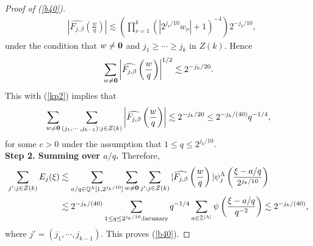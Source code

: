 \documentclass[11 pt,letterpaper]{amsart}
\theoremstyle{plain}
\theoremstyle{definition}
\theoremstyle{remark} \theoremstyle{exam} \theoremstyle{ob}
\numberwithin{equation}{section}
\begin{document}
\begin{proof}[Proof of  (\ref{b40})]
\begin{align*}
&\left|\widehat{F_{j,\beta}}\left(\frac{w}{q} \right)\right| \lesssim  \left(\prod_{\nu=1}^k (|2^{j_\nu/10}w_\nu|+1)^{-4} \right)
  2^{-j_k/10},
\end{align*}
under the condition that
$w \ne {\bf 0}$ and $j_1\ge \cdots \ge j_k$ in $Z(k)$. Hence
\begin{align*}
  \sum_{w \ne {\bf 0}}   \left|\widehat{F_{j,\beta}}\left(\frac{w}{q} \right)\right|^{1/2} \lesssim 2^{-j_k/20}.
\end{align*}
This with (\ref{kp2})  implies that
\begin{align*} 
  \sum_{w \ne {\bf 0}}\sum_{(j_1,\cdots,j_{k-1}):j\in Z(k)} 
 \left|\widehat{F_{j,\beta}}\left(\frac{w}{q} \right)\right| \lesssim 2^{-j_k/20} \le 2^{-j_k/(40)}q^{-1/4},
\end{align*}
for some $c>0$ under the assumption that $1\le q\le 2^{j_k/10}$. 
\\
\textbf{Step 2. Summing over $a/q$.}
Therefore, 
\begin{align*}
\sum_{j'  :j\in Z(k)} E_j(\xi)&\lesssim \sum_{a/q\in \mathbb{Q}^{\Lambda}[1, 2^{j_k/10}] } \sum_{w \ne {\bf 0}}  \sum_{j':j\in Z(k)} |\widehat{F_{j,\beta}}\left(\frac{w}{q}  \right)|   \psi_j^{\Lambda}\left( \frac{\xi-a/q}{2^{j_{k}/10}} \right)\\
&\lesssim 2^{-j_k/(40)} \sum_{1\le q\le 2^{j_k/10}:\rm{lacunary}}q^{-1/4}\sum_{a\in\mathbb{Z}^{|\Lambda|}}\psi\left( \frac{\xi-a/q}{q^{-2}}\right)  \lesssim 2^{-j_k/(40)},
\end{align*}
where $j'=(j_1,\cdots,j_{k-1})$. This proves (\ref{b40}).  
\end{proof}





 
\end{document}
